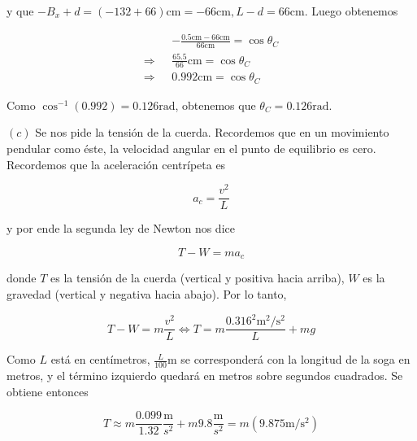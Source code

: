 \documentclass[12pt]{article}
\theoremstyle{definition}
\begin{document}
y que $-B_x + d = (-132 + 66)\text{cm} = -66\text{cm}, L - d = 66\text{cm}$.
Luego obtenemos 

\begin{align*}
    &- \frac{0.5\text{cm} - 66\text{cm}}{66\text{cm}} = \cos \theta_C\\ 
    \Rightarrow ~ ~ ~ 
    & \frac{65.5}{66}\text{cm} = \cos \theta_C \\ 
    \Rightarrow ~ ~ ~ 
    &0.992 \text{cm} = \cos \theta_C
\end{align*}

Como $\cos^{-1}(0.992) = 0.126\text{rad}$, obtenemos que $\theta_C =
0.126\text{rad}$.

$(c)$ Se nos pide la tensión de la cuerda. Recordemos que en un movimiento
pendular como éste, la velocidad angular en el punto de equilibrio es cero.
Recordemos que la aceleración centrípeta es 

\begin{equation}
    a_c = \frac{v^2}{L}
\end{equation}

y por ende la segunda ley de Newton nos dice

\begin{equation}
    T - W = ma_c
\end{equation}

donde $T$ es la tensión de la cuerda (vertical y positiva hacia arriba), $W$ es
la gravedad (vertical y negativa hacia abajo). Por lo tanto, 

\begin{equation}
T - W = m \frac{v^2}{L} \iff T = m \frac{0.316^2 \text{m}^2/\text{s}^2}{L} + mg
\end{equation}

Como $L$ está en centímetros, $\frac{L}{100} \text{m}$ se corresponderá con la
longitud de la soga en metros, y el término izquierdo quedará en metros sobre
segundos cuadrados. Se obtiene entonces 

\begin{equation}
    T \approx m \frac{ 0.099 }{1.32} \frac{\text{m}}{s^2} + m 9.8 \frac{\text{m}}{s^2} = m\left(
    9.875 \text{m}/\text{s}^2 \right) 
\end{equation}

\pagebreak 
\end{document}
